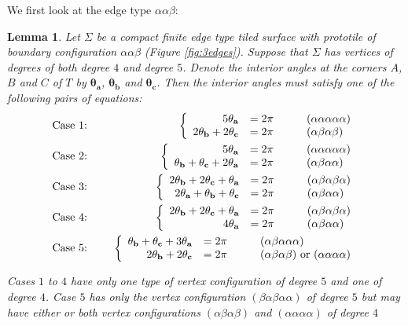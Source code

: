 \documentclass[11pt]{amsart}
\newcommand{\tA}{\mathbf{\theta_a}}
\newcommand{\tB}{\mathbf{\theta_b}}
\newcommand{\tC}{\mathbf{\theta_c}}
\newcommand{\beqas}{\begin{eqnarray*}}
\newcommand{\eeqas}{\end{eqnarray*}}
\newtheorem{lemma}[theorem]{Lemma}
\theoremstyle{remark}
\begin{document}
We first look at the edge type $\alpha \alpha \beta$:
\begin{lemma}  \label{aablemma}
Let $\Sigma$ be a compact finite edge type tiled surface with prototile of boundary configuration $\alpha \alpha \beta$ (Figure \ref{fig:3edges}).  Suppose that $\Sigma$ has vertices of degrees of both degree $4$ and degree $5$.
Denote the
interior angles at the corners $A$,$B$ and $C$ of $T$ by  $\tA$, $\tB$ and $\tC$.  Then the interior angles
must satisfy one of the following pairs of equations:
\beqas
 \hbox{Case 1: } &\quad & 
    \left\{ \begin{array}{rll} 5\tA &=2\pi  \quad \quad&  (\alpha \alpha \alpha \alpha \alpha) \\
            2\tB+2\tC &=2\pi    \quad \quad  &(\alpha \beta \alpha \beta)  \end{array}\right.    \\
   \hbox{Case 2: }  &\quad &
        \left\{ \begin{array}{rll} 5\tA & =2\pi \quad \quad  &  (\alpha \alpha \alpha \alpha \alpha) \\
                   \tB+\tC+2\tA&=2\pi  &  (\alpha \beta \alpha \alpha)   \end{array}\right.    \\
 \hbox{Case 3: } &\quad
& \left\{ \begin{array}{rll} 2\tB+2\tC+\tA &=2\pi \quad \quad  & (\alpha \beta \alpha \beta \alpha)  \\
   2\tA +\tB+\tC &=2\pi \quad \quad   &  (\alpha \beta \alpha \alpha)  \end{array}\right.\\
 \hbox{Case 4: }   & \quad
& \left\{ \begin{array}{rll}  2\tB+2\tC+\tA &=2\pi  \quad \quad  & (\alpha \beta \alpha \beta \alpha)\\ 
          4\tA&=2\pi \quad \quad   &  (\alpha \beta \alpha \alpha)  \end{array}\right. \\
 \hbox{Case 5: }& \quad
& \left\{ \begin{array}{rll} \tB+\tC+3\tA &=2\pi   \quad \quad  & (\alpha \beta \alpha \alpha \alpha) \\
          2\tB+2\tC &=2\pi \quad \quad   &  (\alpha \beta \alpha \beta) \hbox{ or } (\alpha \alpha \alpha \alpha) \end{array}\right. \\
\eeqas

Cases $1$ to $4$ have only one type of vertex configuration of degree $5$ and one of degree $4$. Case $5$ has only
the vertex configuration $(\beta \alpha \beta \alpha \alpha)$ of degree $5$ but may have either or both 
vertex configurations
$(\alpha \beta \alpha \beta)$ and $(\alpha \alpha \alpha \alpha)$ of degree $4$
\end{lemma}
\end{document}
